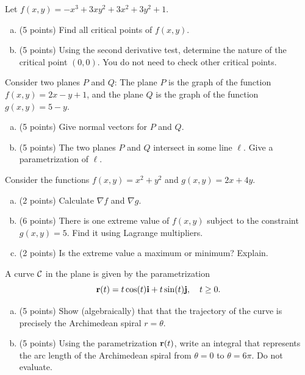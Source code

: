 \documentclass[11pt,oneside]{amsart}
\begin{document}
\newpage

\begin{problem}
  Let $f(x,y)=-x^3+3xy^2+3x^2+3y^2+1$.
  \begin{enumerate}[(a)]
    \item (5 points) Find all critical points of $f(x,y)$.
    \vfil
    \item (5 points) Using the second derivative test, determine the nature of the critical point $(0,0)$. You do not need to check other critical points.
  \end{enumerate}
\end{problem}

\newpage

\begin{problem}[10 points]
  Consider two planes $P$ and $Q$: The plane $P$ is the graph of the function $f(x,y)=2x-y+1$, and the plane $Q$ is the graph of the function $g(x,y)=5-y$.
  \begin{enumerate}[(a)]
    \item (5 points) Give normal vectors for $P$ and $Q$.
    \vfil
    \item (5 points) The two planes $P$ and $Q$ intersect in some line $\ell$. Give a parametrization of $\ell$.
  \end{enumerate}
\end{problem}

\newpage

\begin{problem}
  Consider the functions $f(x,y)=x^2+y^2$ and $g(x,y)=2x+4y$.
  \begin{enumerate}[(a)]
    \item (2 points) Calculate $\nabla f$ and $\nabla g$.
    \vfil
    \item (6 points) There is one extreme value of $f(x,y)$ subject to the constraint $g(x,y)=5$. Find it using Lagrange multipliers.
    \vfil
    \vfil
    \item (2 points) Is the extreme value a maximum or minimum? Explain.
  \end{enumerate}
\end{problem}

\newpage

\begin{problem}
  A curve $\mathcal C$ in the plane is given by the parametrization
  \[\mathbf r(t)=t\cos(t)\mathbf i + t\sin(t)\mathbf j,\quad t\geq 0.\]
  \begin{enumerate}[(a)]
    \item (5 points) Show (algebraically) that that the trajectory of the curve is precisely the Archimedean spiral $r=\theta$.
    \vfil
    \item (5 points) Using the parametrization $\mathbf r(t)$, write an integral that represents the arc length of the Archimedean spiral from $\theta=0$ to $\theta=6\pi$. Do not evaluate.
  \end{enumerate}
\end{problem}
\end{document}

